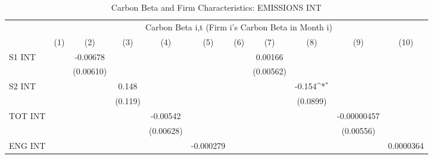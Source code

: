 \begin{table}[htbp]\centering
\def\sym#1{\ifmmode^{#1}\else\(^{#1}\)\fi}
\caption{Carbon Beta and Firm Characteristics: EMISSIONS INT}
\begin{tabular}{l*{10}{c}}
\hline\hline
                &\multicolumn{10}{c}{Carbon Beta i,t (Firm i's Carbon Beta in Month i)}                                                                                                                       \\\cmidrule(lr){2-11}
                &\multicolumn{1}{c}{(1)}         &\multicolumn{1}{c}{(2)}         &\multicolumn{1}{c}{(3)}         &\multicolumn{1}{c}{(4)}         &\multicolumn{1}{c}{(5)}         &\multicolumn{1}{c}{(6)}         &\multicolumn{1}{c}{(7)}         &\multicolumn{1}{c}{(8)}         &\multicolumn{1}{c}{(9)}         &\multicolumn{1}{c}{(10)}         \\
\hline
S1 INT          &                  & -0.00678         &                  &                  &                  &                  &  0.00166         &                  &                  &                  \\
                &                  &(0.00610)         &                  &                  &                  &                  &(0.00562)         &                  &                  &                  \\
S2 INT          &                  &                  &    0.148         &                  &                  &                  &                  &   -0.154\sym{*}  &                  &                  \\
                &                  &                  &  (0.119)         &                  &                  &                  &                  & (0.0899)         &                  &                  \\
TOT INT         &                  &                  &                  & -0.00542         &                  &                  &                  &                  &-0.00000457         &                  \\
                &                  &                  &                  &(0.00628)         &                  &                  &                  &                  &(0.00556)         &                  \\
ENG INT         &                  &                  &                  &                  &-0.000279         &                  &                  &                  &                  &0.0000364         \\

\end{tabular}
\end{table}
